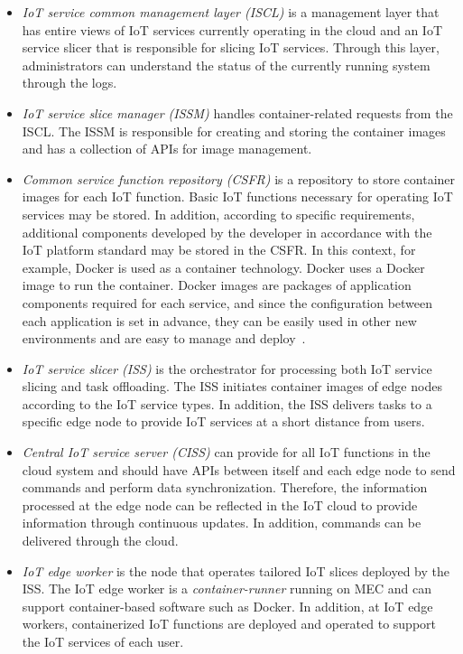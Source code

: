 \begin{itemize}
\item \textit{IoT service common management layer (ISCL)} is a management layer that has entire views of IoT services currently operating in the cloud and an IoT service slicer that is responsible for slicing IoT services. Through this layer, administrators can understand the status of the currently running system through the logs.

\item \textit{IoT service slice manager (ISSM)} handles container-related requests from the ISCL. The ISSM is responsible for creating and storing the container images and has a collection of APIs for image management.

\item \textit{Common service function repository (CSFR)} is a repository to store container images for each IoT function. Basic IoT functions necessary for operating IoT services may be stored. In addition, according to specific requirements, additional components developed by the developer in accordance with the IoT platform standard may be stored in the CSFR. In this context, for example, Docker is used as a container technology. Docker uses a Docker image to run the container. Docker images are packages of application components required for each service, and since the configuration between each application is set in advance, they can be easily used in other new environments and are easy to manage and deploy~\cite{brogi2017dockerfinder}.

\item \textit{IoT service slicer (ISS)} is the orchestrator for processing both IoT service slicing and task offloading. The ISS initiates container images of edge nodes according to the IoT service types. In addition, the ISS delivers tasks to a specific edge node to provide IoT services at a short distance from users.

\item \textit{Central IoT service server (CISS)} can provide for all IoT functions in the cloud system and should have APIs between itself and each edge node to send commands and perform data synchronization. Therefore, the information processed at the edge node can be reflected in the IoT cloud to provide information through continuous updates. In addition, commands can be delivered through the cloud.

\item \textit{IoT edge worker} is the node that operates tailored IoT slices deployed by the ISS. The IoT edge worker is a \textit{container-runner} running on MEC and can support container-based software such as Docker. In addition, at IoT edge workers, containerized IoT functions are deployed and operated to support the IoT services of each user.
\end{itemize}

